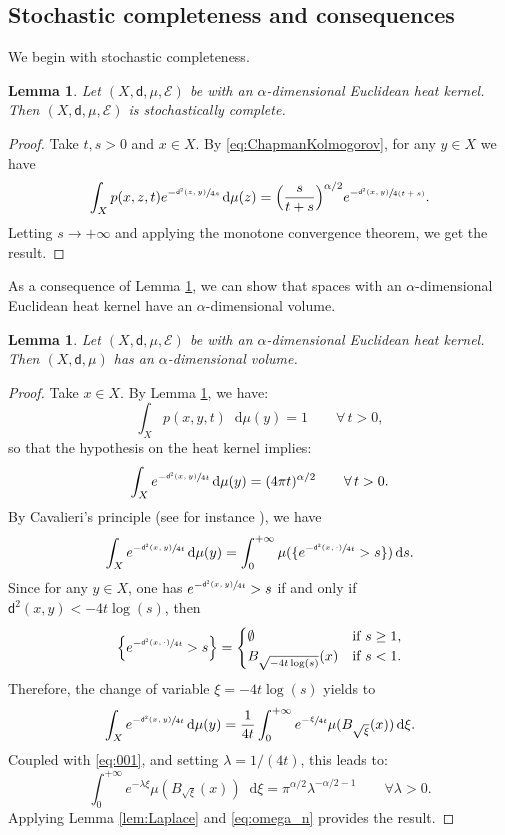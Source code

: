 \documentclass[JEP,XML,SOM,Unicode,published]{cedram}
\theoremstyle{plain}
\newtheorem{lemma}[theorem]{Lemma}
\theoremstyle{definition}
\newcommand{\cE}{\mathcal{E}}
\newcommand{\di}{\mathop{}\!\mathrm{d}}
\newcommand{\dist}{\mathsf{d}}
\begin{document}
\subsection{Stochastic completeness and consequences}

We begin with stochastic completeness.

\begin{lemma}\label{lem:stochastic}
Let $(X,\dist,\mu,\cE)$ be with an $\alpha$-dimensional Euclidean heat kernel.
Then $(X,\dist,\mu,\cE)$ is stochastically complete.
\end{lemma}

\begin{proof}
Take $t,s>0$ and $x \in X$. By \eqref{eq:ChapmanKolmogorov}, for any $y \in X$ we have
\begin{equation}\label{eq:Lem3.1}
\int_X p(x,z,t)e^{-\sfrac{\dist^2(z,y)}{4s}} \di \mu(z) = \Bigl(\frac{s}{t+s}\Bigr)^{\alpha/2} e^{-\sfrac{\dist^2(x,y)}{4(t+s)}}.
\end{equation}
Letting $s \to +\infty$ and applying the monotone convergence theorem, we get the result.
\end{proof}

As a consequence of Lemma \ref{lem:stochastic}, we can show that spaces with an $\alpha$-dimensional Euclidean heat kernel have an $\alpha$-dimensional volume.

\begin{lemma}\label{lem:euclideanvolume}
Let $(X,\dist,\mu,\cE)$ be with an $\alpha$-dimensional Euclidean heat kernel. Then $(X,\dist,\mu)$ has an $\alpha$-dimensional volume.
\end{lemma}

\begin{proof}
Take $x \in X$. By Lemma \ref{lem:stochastic}, we have:
\[
\int_X p(x,y,t) \di \mu(y) = 1 \qquad \forall \, t>0,
\]
so that the hypothesis on the heat kernel implies:
\begin{equation}\label{eq:001}
\int_X e^{-\sfrac{\dist^2(x,y)}{4t}} \di \mu(y) = (4\pi t)^{\alpha/2} \qquad \forall \, t>0.
\end{equation}
By Cavalieri's principle (see for instance \cite[Lem.\,5.2.1]{AmbrosioTilli}), we have
\[
\int_X e^{-\sfrac{\dist^2(x,y)}{4t}}\di \mu(y) = \int_0^{+\infty} \mu(\{e^{-\sfrac{\dist^2(x,\cdot)}{4t}}>s\}) \di s.
\]
Since for any $y \in X$, one has $e^{-\sfrac{\dist^2(x,y)}{4t}}>s$ if and only if $\dist^2(x,y) < - 4t \log(s)$, then
\[
\Bigl\{e^{-\sfrac{\dist^2(x,\cdot)}{4t}}>s\Bigr\}
= \begin{cases}
\emptyset & \text{if $s\ge 1$},\\
B_{\sqrt{-4t\log(s)}}(x) & \text{if $s<1$}.
\end{cases}
\]
Therefore, the change of variable $\xi=-4t\log(s)$ yields to
\[
\int_X e^{-\sfrac{\dist^2(x,y)}{4t}}\di \mu(y) = \frac{1}{4t} \int_0^{+\infty} e^{-\sfrac{\xi}{4t}} \mu(B_{\sqrt{\xi}}(x)) \di \xi.
\]
Coupled with \eqref{eq:001}, and setting $\lambda=1/(4t)$, this leads to:
\[
\int_0^{+\infty} e^{-\lambda \xi} \mu(B_{\sqrt{\xi}}(x)) \di \xi = \pi^{\alpha/2} \lambda^{-\alpha/2-1} \qquad \forall \lambda>0.
\]
Applying Lemma \ref{lem:Laplace} and \eqref{eq:omega_n} provides the result.
\end{proof}
\end{document}
